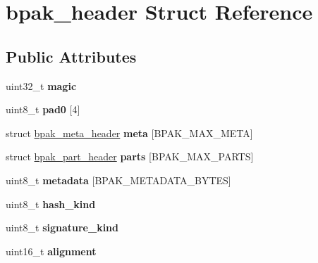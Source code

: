 \hypertarget{structbpak__header}{}\section{bpak\+\_\+header Struct Reference}
\label{structbpak__header}
\subsection*{Public Attributes}
\begin{DoxyCompactItemize}
\item 
\mbox{\label{structbpak__header_aca592714523cf7c22522b6029d1b6ce1}} 
uint32\+\_\+t {\bfseries magic}
\item 
\mbox{\label{structbpak__header_a6a07de952d96674585dd0659a86f0f93}} 
uint8\+\_\+t {\bfseries pad0} \mbox{[}4\mbox{]}
\item 
\mbox{\label{structbpak__header_a5c73f20c83a026674a90a94431924627}} 
struct \hyperlink{structbpak__meta__header}{bpak\+\_\+meta\+\_\+header} {\bfseries meta} \mbox{[}B\+P\+A\+K\+\_\+\+M\+A\+X\+\_\+\+M\+E\+TA\mbox{]}
\item 
\mbox{\label{structbpak__header_ae2795f463936d5f1260ffe97572c1666}} 
struct \hyperlink{structbpak__part__header}{bpak\+\_\+part\+\_\+header} {\bfseries parts} \mbox{[}B\+P\+A\+K\+\_\+\+M\+A\+X\+\_\+\+P\+A\+R\+TS\mbox{]}
\item 
\mbox{\label{structbpak__header_a16121dc2c1d3fffeaba2c0d8bb916a05}} 
uint8\+\_\+t {\bfseries metadata} \mbox{[}B\+P\+A\+K\+\_\+\+M\+E\+T\+A\+D\+A\+T\+A\+\_\+\+B\+Y\+T\+ES\mbox{]}
\item 
\mbox{\label{structbpak__header_a8c86bca96eea83a3cf3c9ab6bf300a04}} 
uint8\+\_\+t {\bfseries hash\+\_\+kind}
\item 
\mbox{\label{structbpak__header_ae90cee9c4c72a0533c854587c6faa7df}} 
uint8\+\_\+t {\bfseries signature\+\_\+kind}
\item 
\mbox{\label{structbpak__header_a687de3b1b9a32e786e91fbeb7f06176c}} 
uint16\+\_\+t {\bfseries alignment}

\end{DoxyCompactItemize}
